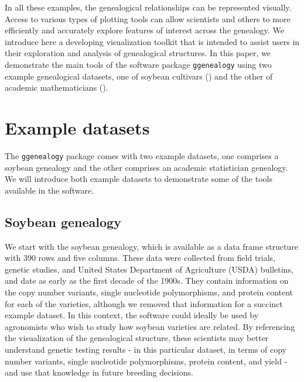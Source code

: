 \documentclass[11pt,a4paper,oldfontcommands,openany]{memoir}
\numberwithin{equation}{section} %
\newcommand{\pkg}[1]{{\texttt{#1}}}
\begin{document}
In all these examples, the genealogical relationships can be represented visually. Access to various types of plotting tools can allow scientists and others to more efficiently and accurately explore features of interest across the genealogy. We introduce here a developing visualization toolkit that is intended to assist users in their exploration and analysis of genealogical structures. In this paper, we demonstrate the main tools of the software package \pkg{ggenealogy} using two example genealogical datasets, one of soybean cultivars (\citealt{soybean}) and the other of academic mathematicians (\citealt{mgp}).

\section{Example datasets}
\label{exData}

The \pkg{ggenealogy} package comes with two example datasets, one comprises a soybean genealogy and the other comprises an academic statistician genealogy. We will introduce both example datasets to demonstrate some of the tools available in the software.

\subsection{Soybean genealogy}

We start with the soybean genealogy, which is available as a data frame structure with 390 rows and five columns. These data were collected from field trials, genetic studies, and United States Department of Agriculture (USDA) bulletins, and date as early as the first decade of the 1900s. They contain information on the copy number variants, single nucleotide polymorphisms, and protein content for each of the varieties, although we removed that information for a succinct example dataset. In this context, the software could ideally be used by agronomists who wish to study how soybean varieties are related. By referencing the visualization of the genealogical structure, these scientists may better understand genetic testing results - in this particular dataset, in terms of copy number variants, single nucleotide polymorphisms, protein content, and yield - and use that knowledge in future breeding decisions.
\end{document}
